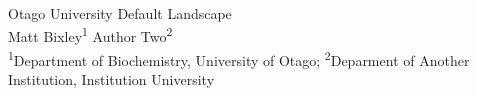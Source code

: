 \documentclass[article,6pt,extrafontsizes]{memoir}
\begin{document}
\begin{topbox}
  \color{titletextcol}
  \vspace{0.5in}
  \Huge{\selectfont Otago University Default Landscape}  \\[0.3in]  %
  \color{authortextcol} \Large{Matt Bixley\textsuperscript{1} Author Two\textsuperscript{2}} \\[0.2in] %
  \color{affiliationtextcol} \large{\textsuperscript{1}Department of Biochemistry, University of Otago;
\textsuperscript{2}Deparment of Another Institution, Institution
University} %
  \vspace{1cm}
\end{topbox}
\end{document}
